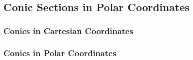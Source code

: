 \subsection{Conic Sections in Polar Coordinates}

\subsubsection*{Conics in Cartesian Coordinates}

\subsubsection*{Conics in Polar Coordinates}